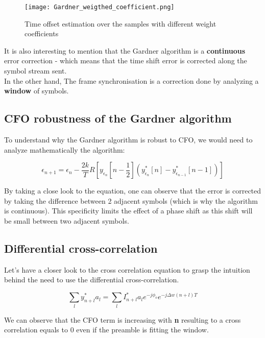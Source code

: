 \begin{figure}[H]
    \centering
    \texttt{[image: Gardner\_weigthed\_coefficient.png]}
    \caption{Time offset estimation over the samples with different weight coefficients}
    \label{fig:Gardner_weigthed_coefficient}
\end{figure}

It is also interesting to mention that the Gardner algorithm is a \textbf{continuous} error correction - which means that
the time shift error is corrected along the symbol stream sent.\\
In the other hand, The frame synchronisation is a correction done by analyzing a \textbf{window} of symbols.

\subsection{CFO robustness of the Gardner algorithm}

To understand why the Gardner algorithm is robust to CFO, we would need to analyze mathematically the algorithm:

\begin{equation*}
    \epsilon_{n+1} = \epsilon_{n} - \frac{2k}{T} R[y_{\epsilon_{n}}[n-\frac{1}{2}](y_{\epsilon_{n}}^{*}[n] - y_{\epsilon_{n-1}}^{*}[n-1])]
\end{equation*}

By taking a close look to the equation, one can observe that the error is corrected by taking the difference between 2 adjacent symbols (which is why the algorithm is
continuous). This specificity limits the effect of a phase shift as this shift will be small between two adjacent symbols.

\subsection{Differential cross-correlation}

Let's have a closer look to the cross correlation equation to grasp the intuition behind the need to use the differential cross-correlation.

\begin{equation*}
    \sum_{l}{y^{*}_{n+l}a_{l}} = \sum_{l}{I^{*}_{n+l}a_{l}e^{-j\phi_{o}}e^{-j\Delta w(n+l)T}}
\end{equation*}

We can observe that the CFO term is increasing with \textbf{n} resulting to a cross correlation equals to 0 even if the preamble is fitting
the window.

